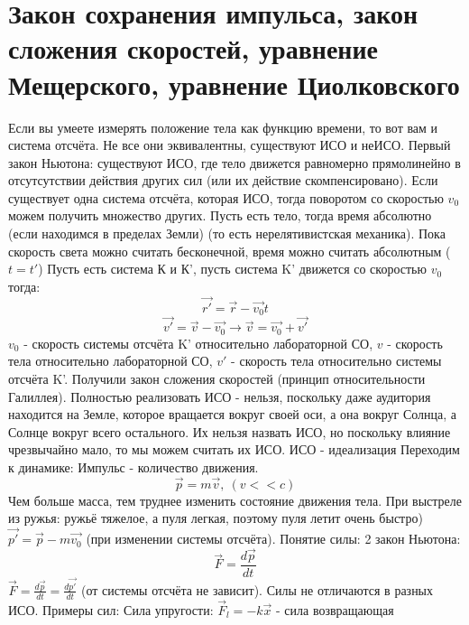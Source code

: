 \section{Закон сохранения импульса, закон сложения скоростей, уравнение Мещерского, уравнение Циолковского}
Если вы умеете измерять положение тела как функцию времени, то вот вам и система отсчёта. Не все они эквивалентны, существуют ИСО и неИСО.
 \newline Первый закон Ньютона: существуют ИСО, где тело движется равномерно прямолинейно в отсутсутствии действия других сил (или их действие скомпенсировано). Если существует одна система отсчёта, которая ИСО, тогда поворотом со скоростью $v_0$ можем получить множество других.
 \newline Пусть есть тело, тогда время абсолютно (если находимся в пределах Земли) (то есть нерелятивистская механика). Пока скорость света можно считать бесконечной, время можно считать абсолютным ($t = t'$)
 Пусть есть система К и К', пусть система K' движется со скоростью $v_0$ 
 тогда:
 \[ \Vec{r'}= \Vec{r} - \Vec{v_0}t\]
 \[\Vec{v'} = \Vec{v} - \Vec{v_0} \rightarrow \Vec{v} = \Vec{v_0} + \Vec{v'}\]
 $v_0$ - скорость системы отсчёта K' относительно лабораторной СО, $v$ - скорость тела относительно лабораторной СО, $v'$ - скорость тела относительно системы отсчёта K'.
 \newline Получили закон сложения скоростей (принцип относительности Галиллея).
 \newline Полностью реализовать ИСО - нельзя, поскольку даже аудитория находится на Земле, которое вращается вокруг своей оси, а она вокруг Солнца, а Солнце вокруг всего остального.
 Их нельзя назвать ИСО, но поскольку влияние чрезвычайно мало, то мы можем считать их ИСО. 
 ИСО - идеализация
 \newline Переходим к динамике:
 Импульс - количество движения. 
 \[\vec{p} = m\vec{v}, \ (v << c)\]
 Чем больше масса, тем труднее изменить состояние движения тела. При выстреле из ружья: ружьё тяжелое, а пуля легкая, поэтому пуля летит очень быстро)
 \newline $\Vec{p'} = \Vec{p} - m\Vec{v_0}$ (при изменении системы отсчёта).
 \newline Понятие силы:
 2 закон Ньютона:
 \[\Vec{F} = \frac{d\Vec{p}}{dt}\]
 $\Vec{F} = \frac{d\Vec{p}}{dt} = \frac{d\Vec{p'}}{dt}$ (от системы отсчёта не зависит). Силы не отличаются в разных ИСО.
 \newline Примеры сил:
 \newline Сила упругости: $\Vec{F}_l = -k\Vec{x}$ - сила возвращающая
